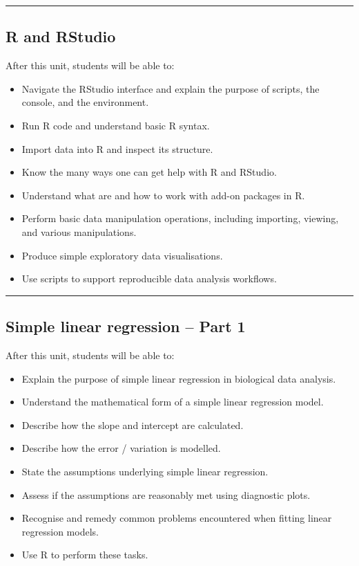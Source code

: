 \documentclass[
  letterpaper,
  8pt,
  a4paper]{book}
\providecommand{\tightlist}{%
  \setlength{\itemsep}{0pt}\setlength{\parskip}{0pt}}
\begin{document}
\begin{center}\rule{0.5\linewidth}{0.5pt}\end{center}

\subsection*{R and RStudio}\label{r-and-rstudio}

After this unit, students will be able to:

\begin{itemize}
\tightlist
\item
  Navigate the RStudio interface and explain the purpose of scripts, the
  console, and the environment.
\item
  Run R code and understand basic R syntax.
\item
  Import data into R and inspect its structure.
\item
  Know the many ways one can get help with R and RStudio.
\item
  Understand what are and how to work with add-on packages in R.
\item
  Perform basic data manipulation operations, including importing,
  viewing, and various manipulations.
\item
  Produce simple exploratory data visualisations.
\item
  Use scripts to support reproducible data analysis workflows.
\end{itemize}

\begin{center}\rule{0.5\linewidth}{0.5pt}\end{center}

\subsection*{Simple linear regression -- Part
1}\label{simple-linear-regression-part-1}

After this unit, students will be able to:

\begin{itemize}
\tightlist
\item
  Explain the purpose of simple linear regression in biological data
  analysis.
\item
  Understand the mathematical form of a simple linear regression model.
\item
  Describe how the slope and intercept are calculated.
\item
  Describe how the error / variation is modelled.
\item
  State the assumptions underlying simple linear regression.
\item
  Assess if the assumptions are reasonably met using diagnostic plots.
\item
  Recognise and remedy common problems encountered when fitting linear
  regression models.
\item
  Use R to perform these tasks.
\end{itemize}
\end{document}
